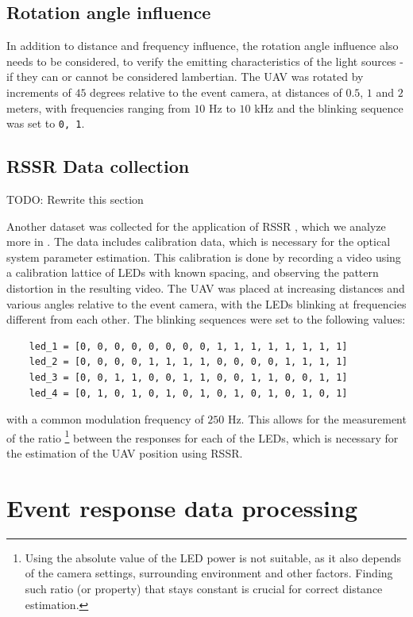 \subsection{Rotation angle influence}

In addition to distance and frequency influence, the rotation angle influence also needs to be considered, to
verify the emitting characteristics of the light sources - if they can or cannot be considered lambertian.
The UAV was rotated by increments of $45$ degrees relative to the event camera, at distances of $0.5$, $1$ and $2$ meters,
with frequencies ranging from $10$ Hz to $10$ kHz and the blinking sequence was set to \texttt{0, 1}.

\subsection{RSSR Data collection}

\Large{TODO: Rewrite this section}

Another dataset was collected for the application of \ac{RSSR} \cite{sooyongrssr}, which we analyze more in .
The data includes calibration data, which is necessary for the optical system parameter estimation. This calibration is done by
recording a video using a calibration lattice of LEDs with known spacing, and observing the pattern distortion in the
resulting video.
The UAV was placed at increasing distances and various angles relative to the event camera, with the LEDs blinking at frequencies different from
each other. 
The blinking sequences were set to the following values:
\begin{lstlisting}
	led_1 = [0, 0, 0, 0, 0, 0, 0, 0, 1, 1, 1, 1, 1, 1, 1, 1]
	led_2 = [0, 0, 0, 0, 1, 1, 1, 1, 0, 0, 0, 0, 1, 1, 1, 1]
	led_3 = [0, 0, 1, 1, 0, 0, 1, 1, 0, 0, 1, 1, 0, 0, 1, 1]
	led_4 = [0, 1, 0, 1, 0, 1, 0, 1, 0, 1, 0, 1, 0, 1, 0, 1]
\end{lstlisting}
with a common modulation frequency of $250$ Hz.
This allows for the measurement of the ratio
\footnote{Using the absolute value of the LED power is not suitable, as it also depends of the camera settings, surrounding
environment and other factors. Finding such ratio (or property) that stays constant is crucial for correct distance estimation.}
between the responses for each of the LEDs, which is necessary
for the estimation of the UAV position using RSSR.

\section{Event response data processing}

